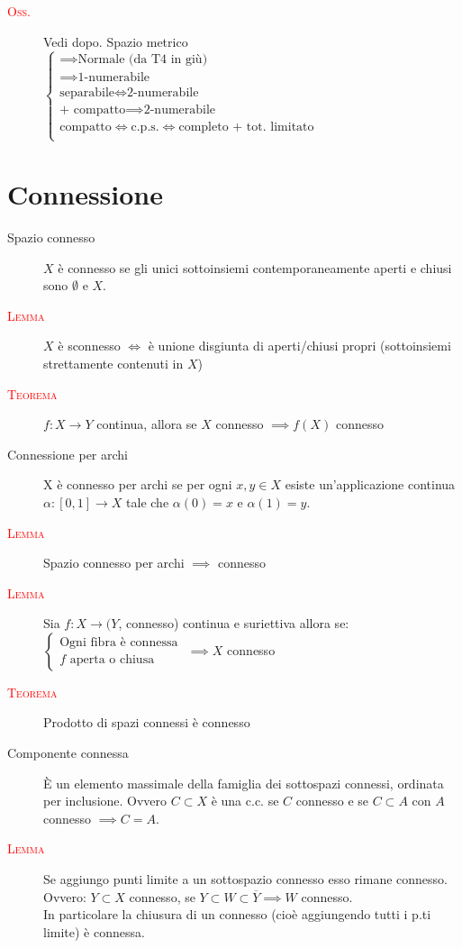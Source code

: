 \documentclass[a4paper,10pt]{article}
\newcommand{\myth}{\normalfont \scshape \textcolor{red}}
\theoremstyle{remark}
\theoremstyle{definition}
\begin{document}
\begin{description}
    \item[\myth{Oss.}] Vedi dopo. Spazio metrico  
    $\begin{cases}
        \implies \mbox{Normale  (da T4 in giù)} \\
        \implies \mbox{1-numerabile}\\
        \mbox{separabile} \iff \mbox{2-numerabile} \\
        \mbox{+ compatto} \implies \mbox{2-numerabile}\\
         \mbox{compatto} \iff \mbox{c.p.s.} \iff \mbox{completo + tot. limitato}  \\
    \end{cases}$
\end{description}

\section*{Connessione}
\begin{description}
    \item[Spazio connesso] $X$ è connesso se gli  unici sottoinsiemi contemporaneamente aperti e chiusi sono $\emptyset$ e $X$. 
    \item[\myth{Lemma}] $X$ è sconnesso $\iff$ è unione disgiunta di aperti/chiusi propri (sottoinsiemi strettamente contenuti in $X$) 
    \item[\myth{Teorema}] $f: X \to Y$ continua, allora se $X$ connesso $\implies f(X)$ connesso
    \item[Connessione per archi] X è connesso per archi se per ogni $x,y \in X$ esiste un'applicazione continua $\alpha : [0,1] \rightarrow X$ tale che $\alpha (0) = x$ e $\alpha (1) = y$.
    \item[\myth{Lemma}] Spazio connesso per archi $\implies$ connesso

    \item[\myth{Lemma}] Sia $f: X \to (Y$, connesso) continua e suriettiva allora se:
    $\begin{cases}
        \mbox{Ogni fibra è connessa} \\
        f\mbox{ aperta o chiusa}
    \end{cases}$
    $\implies X$ connesso 

    \item[\myth{Teorema}] Prodotto di spazi connessi è connesso
    
    \item[Componente connessa] È un elemento massimale della famiglia dei sottospazi connessi, ordinata per inclusione. Ovvero $C \subset X$ è una c.c. se $C$ connesso e se $C \subset A$ con $A$ connesso $\implies C=A$.
    \item[\myth{Lemma}] Se aggiungo punti limite a un sottospazio connesso esso rimane connesso. Ovvero: $Y \subset X$ connesso, se $Y \subset W \subset \overline{Y} \implies W$ connesso.  \\
    In particolare la chiusura di un connesso (cioè aggiungendo tutti i p.ti limite) è connessa.
\end{description}
\end{document}
